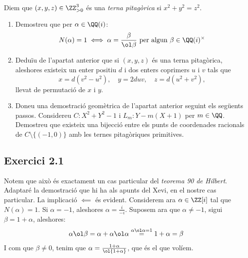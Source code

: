 \documentclass[11pt, a4paper]{article}
\begin{document}
    \newpage
    \begin{tcolorbox}[title=\section{FP1 Exercici 2}]
        Diem que $(x,y,z)\in \ZZ_{>0}^3$ és una \textit{terna pitagòrica} si $x^2+y^2=z^2$.
        \begin{enumerate}
            \item Demostreu que per $\alpha\in\QQ(i)$:
            \[
                N(\alpha)=1\iff \alpha=\frac{\beta}{\ol\beta}\text{ per algun }\beta\in\QQ(i)^\times
            \]
            \item Deduïu de l'apartat anterior que si $(x,y,z)$ és una terna pitagòrica, aleshores existeix un enter positiu $d$ i dos enters coprimers $u$ i $v$ tals que
            \[
            x=d(v^2-u^2),\quad y=2duv,\quad z=d(u^2+v^2),
            \]
            llevat de permutació de $x$ i $y$.
            \item Doneu una demostració geomètrica de l'apartat anterior seguint els següents passos. Considereu $C:X^2+Y^2-1$ i $L_m:Y-m(X+1)$ per $m\in\QQ$. Demostreu que existeix una bijecció entre els punts de coordenades racionals de $C\setminus \{(-1,0)\}$ amb les ternes pitagòriques primitives.
        \end{enumerate}
    \end{tcolorbox}
    \subsection{Exercici 2.1}
    Notem que això és exactament un cas particular del \textit{teorema 90 de Hilbert}. Adaptaré la demostració que hi ha als apunts del Xevi, en el nostre cas particular.
    La implicació $\impliedby$ és evident. Considerem ara $\alpha\in \ZZ[i]$ tal que $N(\alpha)=1$. Si $\alpha=-1$, aleshores $\alpha =\frac{i}{-i}$. Suposem ara que $\alpha\neq -1$, sigui $\beta = 1+\alpha$, aleshores:
    \[
        \alpha\ol\beta=\alpha+ \alpha\ol\alpha\overset{\alpha\ol\alpha=1}{=}1+\alpha=\beta
    \]
    I com que $\beta\neq0$, tenim que $\alpha=\frac{1+\alpha}{\ol{1+\alpha}}$, que és el que volíem.
\end{document}
